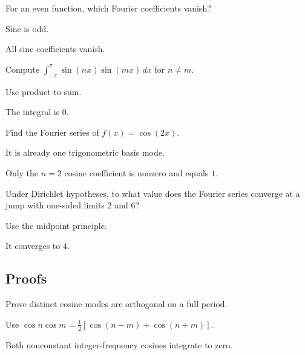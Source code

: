 \begin{exercise}\label{exr:ii14-expand-02}
For an even function, which Fourier coefficients vanish?
\end{exercise}
\begin{hint}
Sine is odd.
\end{hint}
\begin{solution}
All sine coefficients vanish.
\end{solution}

\begin{exercise}[Orthogonality]\label{exr:ii14-expand-03}
Compute \(\int_{-\pi}^{\pi}\sin(nx)\sin(mx)\,dx\) for \(n\ne m\).
\end{exercise}
\begin{hint}
Use product-to-sum.
\end{hint}
\begin{solution}
The integral is \(0\).
\end{solution}

\begin{exercise}\label{exr:ii14-expand-04}
Find the Fourier series of \(f(x)=\cos(2x)\).
\end{exercise}
\begin{hint}
It is already one trigonometric basis mode.
\end{hint}
\begin{solution}
Only the \(n=2\) cosine coefficient is nonzero and equals \(1\).
\end{solution}

\begin{exercise}\label{exr:ii14-expand-05}
Under Dirichlet hypotheses, to what value does the Fourier series converge at a jump with one-sided limits \(2\) and \(6\)?
\end{exercise}
\begin{hint}
Use the midpoint principle.
\end{hint}
\begin{solution}
It converges to \(4\).
\end{solution}

\subsection*{Proofs}

\begin{exercise}\label{exr:ii14-expand-06}
Prove distinct cosine modes are orthogonal on a full period.
\end{exercise}
\begin{hint}
Use \(\cos n\cos m=\frac12[\cos(n-m)+\cos(n+m)]\).
\end{hint}
\begin{solution}
Both nonconstant integer-frequency cosines integrate to zero.
\end{solution}

